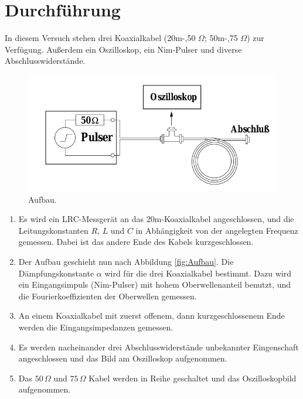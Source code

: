

\section{Durchführung}
In diesem Versuch stehen drei Koaxialkabel (20m-,50 $\Omega$; 50m-,75 $\Omega$)
zur
Verfügung. Außerdem ein Oszilloskop, ein Nim-Pulser und diverse
Abschlusswiderstände.

\begin{figure}[htpb]
  \centering
  \includegraphics[scale=1.0]{bilder/aufbau.png}
  \caption{Aufbau.}
\label{fig:aufbau}
\end{figure}

\begin{enumerate}
\item 	Es wird ein LRC-Messgerät an das 20m-Koaxialkabel angeschlossen, und die
		Leitungskonstanten $R$, $L$ und $C$ in Abhängigkeit von der angelegten
		Frequenz gemessen. Dabei ist das andere Ende des Kabels kurzgeschlossen.

\item 	Der Aufbau geschieht nun nach Abbildung \ref{fig:Aufbau}.
		Die Dämpfungskonstante $\alpha$ wird für die drei Koaxialkabel bestimmt.
		Dazu wird ein Eingangsimpuls (Nim-Pulser) mit hohem Oberwellenanteil
		benutzt, und die
		Fourierkoeffizienten der Oberwellen gemessen.

\item 	An einem Koaxialkabel mit zuerst offenem, dann kurzgeschlossenem Ende
		werden die Eingangsimpedanzen gemessen.

\item	Es werden
		nacheinander drei Abschlusswiderstände unbekannter Eingenschaft
		angeschlossen und das Bild am Oszilloskop aufgenommen.

\item	Das $50 \,\Omega$ und $75 \, \Omega$ Kabel werden in Reihe geschaltet und
		das	Oszilloskopbild aufgenommen.


\end{enumerate}

